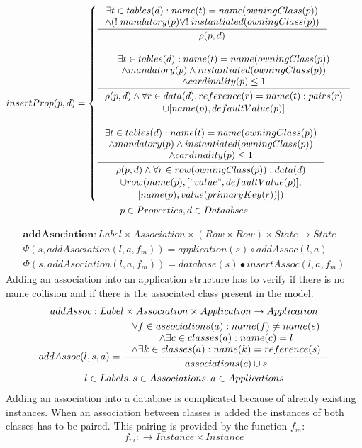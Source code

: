 \documentclass[11pt]{article}
\begin{document}
\begin{gather*}
insertProp(p, d) = \begin{cases}
\inference{ \exists t \in tables(d) : name(t) = name(owningClass(p)) \\ \wedge (!\;mandatory(p) \vee !\;instantiated(owningClass(p))}{ \rho(p,d)} 
\\ \\ 
\inference{ \exists t \in tables(d) : name(t) = name(owningClass(p)) \\ \wedge mandatory(p) \wedge instantiated(owningClass(p)) \\ \wedge cardinality(p) \leq 1}{\begin{gathered}
 \rho(p,d) \wedge \forall r \in data(d), reference(r) = name(t) : pairs(r) \\ \cup [name(p), defaultValue(p)]
\end{gathered}
} 
\\ \\
\inference{ \exists t \in tables(d) : name(t) = name(owningClass(p)) \\ \wedge mandatory(p) \wedge instantiated(owningClass(p)) \\ \wedge cardinality(p) \leq 1}{\begin{gathered}
 \rho(p,d) \wedge \forall r \in row(owningClass(p)) : data(d)\\ \cup row(name(p), ["value", defaultValue(p)], \\ [name(p), value(primaryKey(r))]) 
\end{gathered}
} 
\end{cases}\\
p \in Properties, d \in Dataabses
\end{gather*}

\begin{gather*}
\mathbf{addAsociation} : Label \times Association \times (Row \times Row) \times State \rightarrow State \\
\Psi(s, addAsociation(l, a, f_m)) = application(s) \circ addAssoc(l, a) \\
\Phi(s, addAsociation(l, a, f_m)) = database(s) \bullet insertAssoc(l, a, f_m)
\end{gather*}
Adding an association into an application structure has to verify if there is no name collision and if there is the associated class present in the model.
\begin{gather*}
addAssoc : Label \times Association \times Application \rightarrow Application \\
addAssoc(l, s, a) = \inference{\forall f \in associations(a) : name(f) \neq name(s) \\ \wedge \exists c \in classes(a) : name(c) = l \\ \wedge \exists k \in classes(a) : name(k) = reference(s) }{associations(c) \cup s}\\
l \in Labels, s \in Associations, a \in Applications
\end{gather*}
Adding an association into a database is complicated because of already existing instances. When an association between classes is added the instances of both classes has to be paired. This pairing is provided by the function $f_m$:
$$f_m : \rightarrow Instance \times Instance $$
\end{document}
